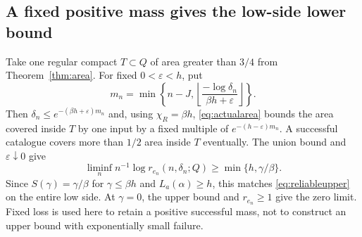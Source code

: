 \documentclass[11pt]{amsart}
\theoremstyle{definition}
\theoremstyle{remark}
\numberwithin{equation}{section}
\begin{document}
\subsection{A fixed positive mass gives the low-side lower bound}
Take one regular compact $T\subset Q$ of area greater than $3/4$
from Theorem~\ref{thm:area}. For fixed $0<\varepsilon<h$, put
\[
m_n=\min\left\{n-J,
\left\lfloor\frac{-\log\delta_n}{\beta h+\varepsilon}\right\rfloor\right\}.
\]
Then $\delta_n\le e^{-(\beta h+\varepsilon)m_n}$ and, using
$\chi_R=\beta h$, \eqref{eq:actualarea} bounds the area covered
inside $T$ by one input by a fixed multiple of
$e^{-(h-\varepsilon)m_n}$.
A successful catalogue covers more than $1/2$ area inside $T$
eventually. The union bound and $\varepsilon\downarrow0$ give
\begin{equation}\label{eq:reliablefixedmass}
\liminf_n n^{-1}\log r_{e_n}(n,\delta_n;Q)
                        \ge\min\{h,\gamma/\beta\}.
\end{equation}
Since $S(\gamma)=\gamma/\beta$ for $\gamma\le\beta h$
and $L_a(\alpha)\ge h$, this matches \eqref{eq:reliableupper}
on the entire low side. At $\gamma=0$, the upper bound and
$r_{e_n}\ge1$ give the zero limit. Fixed loss is used here to
retain a positive successful mass, not to construct an upper
bound with exponentially small failure.
\end{document}
